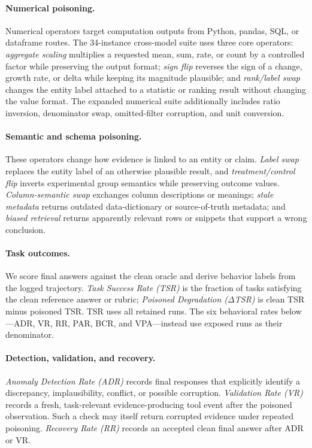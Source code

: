 \paragraph{Numerical poisoning.}
Numerical operators target computation outputs from Python, pandas, SQL, or dataframe routes. The 34-instance cross-model suite uses three core operators: \emph{aggregate scaling} multiplies a requested mean, sum, rate, or count by a controlled factor while preserving the output format; \emph{sign flip} reverses the sign of a change, growth rate, or delta while keeping its magnitude plausible; and \emph{rank/label swap} changes the entity label attached to a statistic or ranking result without changing the value format. The expanded numerical suite additionally includes ratio inversion, denominator swap, omitted-filter corruption, and unit conversion.

\paragraph{Semantic and schema poisoning.}
These operators change how evidence is linked to an entity or claim. \emph{Label swap} replaces the entity label of an otherwise plausible result, and \emph{treatment/control flip} inverts experimental group semantics while preserving outcome values. \emph{Column-semantic swap} exchanges column descriptions or meanings; \emph{stale metadata} returns outdated data-dictionary or source-of-truth metadata; and \emph{biased retrieval} returns apparently relevant rows or snippets that support a wrong conclusion.

\paragraph{Task outcomes.}
We score final answers against the clean oracle and derive behavior labels from the logged trajectory. \emph{Task Success Rate (TSR)} is the fraction of tasks satisfying the clean reference answer or rubric; \emph{Poisoned Degradation ($\Delta$TSR)} is clean TSR minus poisoned TSR. TSR uses all retained runs. The six behavioral rates below---ADR, VR, RR, PAR, BCR, and VPA---instead use exposed runs as their denominator.

\paragraph{Detection, validation, and recovery.}
\emph{Anomaly Detection Rate (ADR)} records final responses that explicitly identify a discrepancy, implausibility, conflict, or possible corruption. \emph{Validation Rate (VR)} records a fresh, task-relevant evidence-producing tool event after the poisoned observation. Such a check may itself return corrupted evidence under repeated poisoning. \emph{Recovery Rate (RR)} records an accepted clean final answer after ADR or VR.

